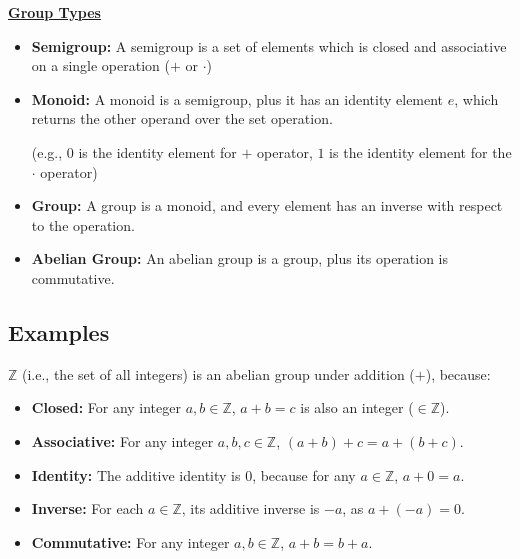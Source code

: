 \begin{tcolorbox}[title={\textbf{\tboxdef{\ref*{subsec:group-def}} Group}}]
$ $

\noindent \textbf{\underline{Group Types}}
\begin{itemize}
\item \textbf{Semigroup:} A semigroup is a set of elements which is closed and associative on a single operation ($+$ or $\cdot$)
\item \textbf{Monoid:} A monoid is a semigroup, plus it has an identity element $e$, which returns the other operand over the set operation.

(e.g., $0$ is the identity element for $+$ operator, $1$ is the identity element for the $\cdot$ operator)
\item \textbf{Group:} A group is a monoid, and every element has an inverse with respect to the operation.
\item \textbf{Abelian Group:} An abelian group is a group, plus its operation is commutative.
\end{itemize}
\end{tcolorbox}

\subsection{Examples}
\label{subsec:group-ex}

$\mathbb{Z}$ (i.e., the set of all integers) is an abelian group under addition ($+$), because:
\begin{itemize}
\item \textbf{Closed:} For any integer $a, b \in \mathbb{Z}$, $a + b = c$ is also an integer ($\in \mathbb{Z}$).
\item \textbf{Associative:} For any integer $a, b, c \in \mathbb{Z}$, $(a + b) + c = a + (b + c)$.
\item \textbf{Identity:} The additive identity is 0, because for any $a \in \mathbb{Z}$, $a + 0 = a$.
\item \textbf{Inverse:} For each $a \in \mathbb{Z}$, its additive inverse is $-a$, as $a + (-a) = 0$.
\item \textbf{Commutative: } For any integer $a, b \in \mathbb{Z}$, $a + b = b + a$.
\end{itemize}

$ $

